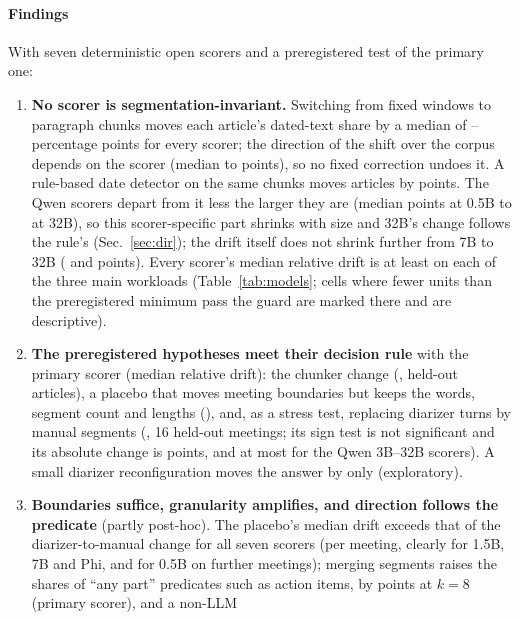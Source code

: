 \documentclass[conference]{IEEEtran}
\begin{document}
\paragraph*{Findings}
With seven deterministic open scorers and a preregistered test of the primary one:
\begin{enumerate}[leftmargin=*,nosep]
\item \textbf{No scorer is segmentation-invariant.} Switching from fixed windows to paragraph chunks moves each
article's dated-text share by a median of \nSixChunkAbsMin--\nSixChunkAbsMax{} percentage points for every scorer;
the direction of the shift over the corpus depends on the scorer (median \nSixChunkSgnMin{} to \nSixChunkSgnMax{}
points), so no fixed correction undoes it. A rule-based date detector on the same chunks moves articles by
\nOrWfourRefAbs{} points. The Qwen scorers depart from it less the larger they are (median \nOrWfourExHalf{} points at
0.5B to \nOrWfourExThirtytwo{} at 32B), so this scorer-specific part shrinks with size and 32B's change follows the rule's
(Sec.~\ref{sec:dir}); the drift itself does not shrink further from 7B to 32B (\nSgWikiQdoneMsevenabsmag{} and
\nSgWikiQdoneMthirtytwoabsmag{} points). Every scorer's median relative drift is at least \nSixDMin{} on each of
the three main workloads (Table~\ref{tab:models}; cells where fewer units than the preregistered minimum pass the guard are marked there
and are descriptive).
\item \textbf{The preregistered hypotheses meet their decision rule} with the primary scorer (median relative drift): the chunker change
(\nHfourmed, \nHfourunits{} held-out articles), a placebo that moves meeting boundaries but keeps the words, segment count and
lengths (\nHtwomed), and, as a stress test, replacing diarizer turns by manual segments (\nHonemed, 16 held-out
meetings; its sign test is not significant and its absolute change is \nSgWoneQoneabsmag{} points, and at most
\nSgWoneQoneMthreeabsmag{} for the Qwen 3B--32B scorers). A small diarizer reconfiguration moves the answer by only
\nWthreeQonemed{} (exploratory).
\item \textbf{Boundaries suffice, granularity amplifies, and direction follows the predicate} (partly post-hoc).
The placebo's median drift exceeds that of the diarizer-to-manual change for all seven scorers (per meeting, clearly
for 1.5B, 7B and Phi, and for 0.5B on \nScaleN{} further meetings); merging segments raises the shares of
``any part'' predicates such as action items, by \nSgEsixkeightQoneabs{} points at $k=8$ (primary scorer), and a non-LLM

\end{enumerate}
\end{document}
